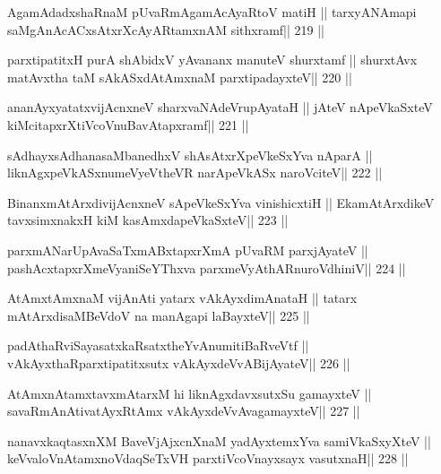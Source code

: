 \begin{shl}
AgamAdadxshaRnaM pUvaRmAgamAcAyaRtoV matiH ||
tarxyANAmapi saMgAnAcACxsAtxrXcAyARtamxnAM sithxramf\hfill || 219 ||
\end{shl}

\begin{shl}
parxtipatitxH purA shAbidxV yAvananx manuteV shurxtamf ||
shurxtAvx matAvx\s tha taM sAkASxdAtAmxnaM parxtipadayxteV\hfill || 220 ||
\end{shl}

\begin{shl}
ananAyxyatatxvijAcnxneV sharxvaNAdeVrupAyataH ||
jAteV nApeVkaSxteV kiMcitapxrXtiVcoV\s nuBavAtapxramf\hfill || 221 ||
\end{shl}

\begin{shl}
sAdhayxsAdhanasaMbanedhxV shAsAtxrXpeVkeSxYva nAparA ||
liknAgxpeVkASx\s numeVyeV\s theVR narApeVkASx naroVciteV\hfill || 222 ||
\end{shl}

\begin{shl}
BinanxmAtArxdivijAcnxneV sApeVkeSxYva vinishicxtiH ||
EkamAtArxdikeV tavxsimxnakxH kiM kasAmxdapeVkaSxteV\hfill || 223 ||
\end{shl}

\begin{shl}
parxmANarUpAvaSaTxmABxtapxrXmA pUvaRM parxjAyateV ||
pashAcxtapxrXmeVyaniSeYThxva parxmeVyAthARnuroVdhiniV\hfill || 224 ||
\end{shl}

\begin{shl}
AtAmx\s\s tAmxnaM vijAnAti yatarx vAkAyxdimAnataH ||
tatarx mAtArxdisaMBeVdoV na manAgapi laBayxteV\hfill || 225 ||
\end{shl}

\begin{shl}
padAthaRviSayasatxkaRsatxtheYvAnumitiBaRveVtf ||
vAkAyxthaRparxtipatitxsutx vAkAyxdeVvABijAyateV\hfill || 226 ||
\end{shl}

\begin{shl}
AtAmxnAtamxtavxmAtarxM hi liknAgxdavxsutxSu gamayxteV ||
savaRmAnAtivatAyxRtAmx vAkAyxdeVvAvagamayxteV\hfill || 227 ||
\end{shl}

\begin{shl}
nanavxkaqtasxnXM BaveVjAjxcnXnaM yadAyxtemxYva samiVkaSxyXteV ||
keVvaloV\s nAtamxnoV\s daqSeTxVH parxtiVcoV\s nayxsayx vasutxnaH\hfill || 228 ||
\end{shl}

